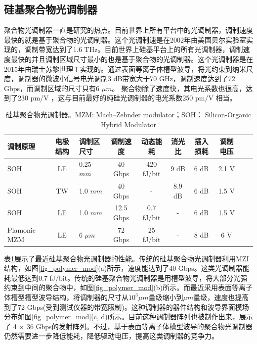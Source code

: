 \subsection{硅基聚合物光调制器}
聚合物光调制器一直是研究的热点。目前世界上所有平台中的光调制器，调制速度最快的就是基于聚合物的光调制器。这个光调制速是在2002年由美国贝尔实验室实现的，调制带宽达到了1.6 THz\cite{lee2002broadband}。目前世界上硅基平台上的所有光调制器，调制速度最快的并且调制区域尺寸最小的也是基于聚合物的光调制器。这个光调制器是在2015年由瑞士苏黎世理工实现的。通过表面等离子体槽型波导，将光约束到纳米尺度，调制器的微波小信号电光调制3 dB带宽大于70 GHz，调制速度达到了72 Gbps，而调制区域的尺寸只有6  $\mu m$。 聚合物除了速度快，其电光系数也很高，达到了230 pm/V \cite{palmer2014high}，这与目前最好的纯硅光调制器的电光系数250 pm/V \cite{timurdogan2014ultralow}相当。
{
	\begin{table}[htb]
		\caption{硅基聚合物光调制器。MZM:  Mach–Zehnder modulator；SOH： Silicon-Organic Hybrid Modulator}
		\label{sil_polymer_mod}
		\centering
		\begin{tabular}[t]{p{1.5cm}cp{1.2cm}ccccccc}
			\hline
			调制原理 & 电极结构 & 调制区尺寸 & 调制速度 & 动态能耗 & 消光比 & 插入损耗 & 调制电压\\
			\hline
			SOH\cite{palmer2014high} & LE  & 0.25 $mm$ & 40 Gbps & 420 fJ/bit & 9 dB & 6 dB & 2.1 V\\
			SOH\cite{palmer2014high} & TW  & 1.0 $mm$ & 40 Gbps & - & 8.9 dB & 6 dB & 1.5 V\\	
			SOH\cite{koeber2015femtojoule} & LE  & 1.0 $mm$ & 12.5 Gbps & 0.7 fJ/bit & - & 6 dB & 1.5 V\\			
			Plamonic MZM\cite{haffner2015all} & LE  & 6 $\mu m$ & 72 Gbps & 25 fJ/bit & - & 8 dB & 6 V\\
			\hline
		\end{tabular}
	\end{table}
}
表\ref{sil_polymer_mod}展示了最近硅基聚合物光调制器的性能。传统的硅基聚合物光调制器利用MZI结构，如图\ref{fig_polymer_mod}(a)所示，速度能达到了40 Gbps。这类光调制器能耗最低达到0.7 fJ/bit。传统的硅基聚合物光调制器是用槽型波导\cite{almeida2004guiding}，将大部分光强约束到中间的聚合物中，如图\ref{fig_polymer_mod}(b)所示\cite{palmer2014high,liu2015recent}。而最近采用表面等离子体槽型槽型波导结构，将调制器的尺寸从$10^3 \mu m$量级缩小到$\mu m$量级，速度也提高到了72 Gbps(受到测试仪器的带宽限制)\cite{haffner2015all}。这种调制器的器件结构和波导界面模场分布如图\ref{fig_polymer_mod}(c, d)所示。目前这种调制器阵列也被制作出来，展示了 4 $\times$ 36 Gbps的发射阵列\cite{heni2015high}。不过，基于表面等离子体槽型波导的聚合物光调制器仍然需要进一步降低能耗，降低驱动电压，提高这类调制器的竞争力。
